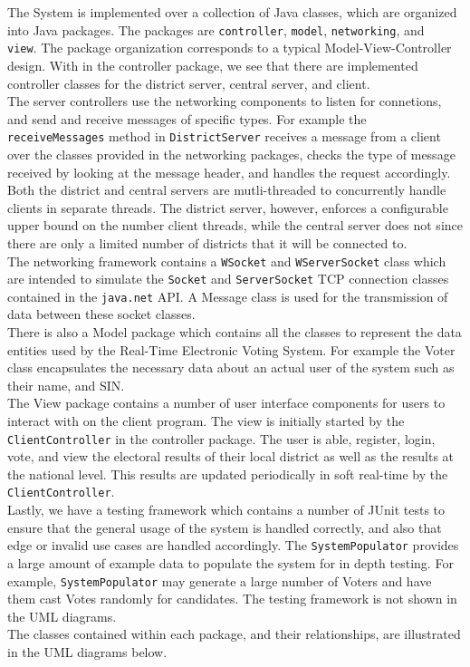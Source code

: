 \documentclass[11pt,english]{article}
\begin{document}
The System is implemented over a collection of Java classes, which are organized into Java
packages. The packages are {\tt controller}, {\tt model}, {\tt networking}, and {\tt
view}. The package organization corresponds to a typical Model-View-Controller design. 
With in the controller package, we see that there are implemented controller classes for the 
district server, central server, and client.
\vspace{2mm} \\
The server controllers use the networking components
to listen for connetions, and send and receive messages of specific types. For example the {\tt receiveMessages}
method in {\tt DistrictServer} receives a message from a client over the classes provided in the networking packages, 
checks the type of message received by looking at the message header, and handles the request accordingly. 
Both the district and central servers are mutli-threaded to concurrently handle clients in separate threads. 
The district server, however, enforces a configurable upper bound on the number client threads, while the 
central server does not since there are only a limited number of districts that it will be connected to.
\vspace{2mm} \\
The networking framework contains a {\tt WSocket} and {\tt WServerSocket} class which are intended to simulate 
the {\tt Socket} and {\tt ServerSocket} TCP connection classes contained in the {\tt java.net} API.
A Message class is used for the transmission of data between these socket classes.
\vspace{2mm} \\
There is also a Model package which contains all the classes to represent the data entities used by the 
Real-Time Electronic Voting System. For example the Voter class encapsulates the necessary data about 
an actual user of the system such as their name, and SIN.
\vspace{2mm} \\
The View package contains a number of user interface components for users to interact with on the client program.
The view is initially started by the {\tt ClientController} in the controller package. The user is able, register,
login, vote, and view the electoral results of their local district as well as the results at the national level. This results
are updated periodically in soft real-time by the {\tt ClientController}. 
\vspace{2mm} \\
Lastly, we have a testing framework which contains a number of JUnit tests to ensure that the general
usage of the system is handled correctly, and also that edge or invalid use cases are handled accordingly.
The {\tt SystemPopulator} provides a large amount of example data to populate the system for in depth testing.
For example, {\tt SystemPopulator} may generate a large number of Voters and have them cast Votes randomly for candidates.
The testing framework is not shown in the UML diagrams.
\vspace{2mm} \\
The classes contained within each package, and their relationships, are illustrated in the UML diagrams below.
\end{document}

